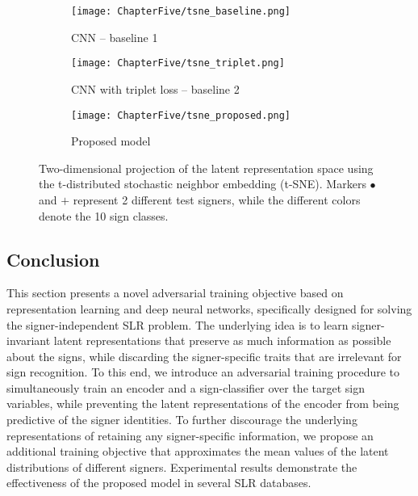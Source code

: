 \begin{figure}
    \centering
    \begin{subfigure}[t]{0.32\textwidth}
        \texttt{[image: ChapterFive/tsne\_baseline.png]}
        \caption{CNN -- baseline 1}
        \label{fig:adv_signer_inv_tsne_a}
    \end{subfigure}
    \begin{subfigure}[t]{0.32\textwidth}
        \texttt{[image: ChapterFive/tsne\_triplet.png]}
        \caption{CNN with triplet loss -- baseline 2}
        \label{fig:adv_signer_inv_tsne_b}
    \end{subfigure}
    \begin{subfigure}[t]{0.32\textwidth}
        \texttt{[image: ChapterFive/tsne\_proposed.png]}
        \caption{Proposed model}
        \label{fig:adv_signer_inv_tsne_c}
    \end{subfigure}
    \caption{\centering Two-dimensional projection of the latent representation space using the t-distributed stochastic neighbor embedding (t-SNE). Markers $\bullet$ and $\textbf{+}$ represent 2 different test signers, while the different colors denote the 10 sign classes.}
    \label{fig:adv_signer_inv_tsne}
\end{figure}

\subsection{Conclusion}
\label{sec:adv_signer_inv_conclusion}

This section presents a novel adversarial training objective based on representation learning and deep neural networks, specifically designed for solving the signer-independent SLR problem. The underlying idea is to learn signer-invariant latent representations that preserve as much information as possible about the signs, while discarding the signer-specific traits that are irrelevant for sign recognition. To this end, we introduce  an adversarial training procedure to simultaneously train an encoder and a sign-classifier over the target sign variables, while preventing the latent representations of the encoder from being predictive of the signer identities. To further discourage the underlying representations of retaining any signer-specific information, we propose an additional training objective that approximates the mean values of the latent distributions of different signers.
Experimental results demonstrate the effectiveness of the proposed model in several SLR databases.

